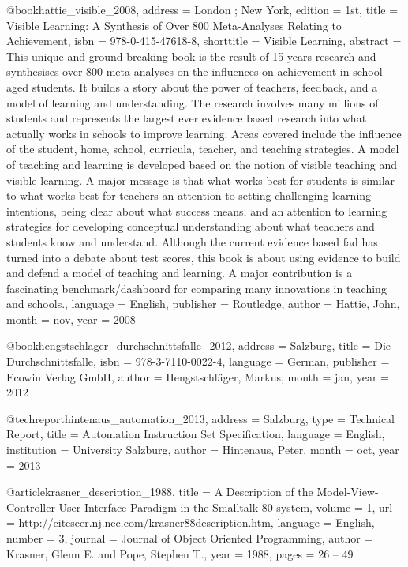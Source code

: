 {@book{hattie_visible_2008,
	address = {London ; New York},
	edition = {1st},
	title = {Visible {Learning}: {A} {Synthesis} of {Over} 800 {Meta}-{Analyses} {Relating} to {Achievement}},
	isbn = {978-0-415-47618-8},
	shorttitle = {Visible {Learning}},
	abstract = {This unique and ground-breaking book is the result of 15 years research and synthesises over 800 meta-analyses on the influences on achievement in school-aged students. It builds a story about the power of teachers, feedback, and a model of learning and understanding. The research involves many millions of students and represents the largest ever evidence based research into what actually works in schools to improve learning. Areas covered include the influence of the student, home, school, curricula, teacher, and teaching strategies. A model of teaching and learning is developed based on the notion of visible teaching and visible learning. A major message is that what works best for students is similar to what works best for teachers {\textendash} an attention to setting challenging learning intentions, being clear about what success means, and an attention to learning strategies for developing conceptual understanding about what teachers and students know and understand. Although the current evidence based fad has turned into a debate about test scores, this book is about using evidence to build and defend a model of teaching and learning. A major contribution is a fascinating benchmark/dashboard for comparing many innovations in teaching and schools.},
	language = {English},
	publisher = {Routledge},
	author = {Hattie, John},
	month = nov,
	year = {2008}
}

@book{hengstschlager_durchschnittsfalle_2012,
	address = {Salzburg},
	title = {Die {Durchschnittsfalle}},
	isbn = {978-3-7110-0022-4},
	language = {German},
	publisher = {Ecowin Verlag GmbH},
	author = {Hengstschl{\"a}ger, Markus},
	month = jan,
	year = {2012}
}

@techreport{hintenaus_automation_2013,
	address = {Salzburg},
	type = {Technical {Report}},
	title = {Automation {Instruction} {Set} {Specification}},
	language = {English},
	institution = {University Salzburg},
	author = {Hintenaus, Peter},
	month = oct,
	year = {2013}
}

@article{krasner_description_1988,
	title = {A {Description} of the {Model}-{View}-{Controller} {User} {Interface} {Paradigm} in the {Smalltalk}-80 system},
	volume = {1},
	url = {http://citeseer.nj.nec.com/krasner88description.htm},
	language = {English},
	number = {3},
	journal = {Journal of Object Oriented Programming},
	author = {Krasner, Glenn E. and Pope, Stephen T.},
	year = {1988},
	pages = {26 -- 49}
}

}
